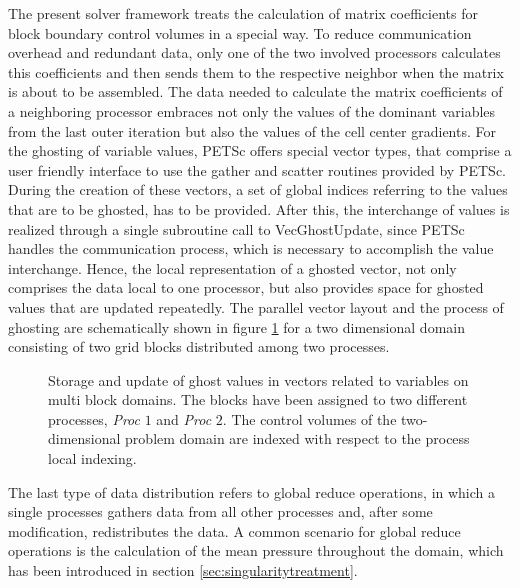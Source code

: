 The present solver framework treats the calculation of matrix coefficients for block boundary control volumes in a special way. To reduce communication overhead and redundant data, only one of the two involved processors calculates this coefficients and then sends them to the respective neighbor when the matrix is about to be assembled. The data needed to calculate the matrix coefficients of a neighboring processor embraces not only the values of the dominant variables from the last outer iteration but also the values of the cell center gradients. For the ghosting of variable values, PETSc offers special vector types, that comprise a user friendly interface to use the gather and scatter routines provided by PETSc. During the creation of these vectors, a set of global indices referring to the values that are to be ghosted, has to be provided. After this, the interchange of values is realized through a single subroutine call to \textrm{VecGhostUpdate}, since PETSc handles the communication process, which is necessary to accomplish the value interchange. Hence, the local representation of a ghosted vector, not only comprises the data local to one processor, but also provides space for ghosted values that are updated repeatedly. The parallel vector layout and the process of ghosting are schematically shown in figure \ref{fig:ghosting} for a two dimensional domain consisting of two grid blocks distributed among two processes.

\begin{figure}
  \centering
  \label{fig:segassemble}
  
  \caption{Storage and update of ghost values in vectors related to variables on multi block domains. The blocks have been assigned to two different processes, \emph{Proc} $1$ and \emph{Proc} $2$. The control volumes of the two-dimensional problem domain are indexed with respect to the process local indexing.}
  \label{fig:ghosting}
\end{figure}

The last type of data distribution refers to global reduce operations, in which a single processes gathers data from all other processes and, after some modification, redistributes the data. A common scenario for global reduce operations is the calculation of the mean pressure throughout the domain, which has been introduced in section \ref{sec:singularitytreatment}.



